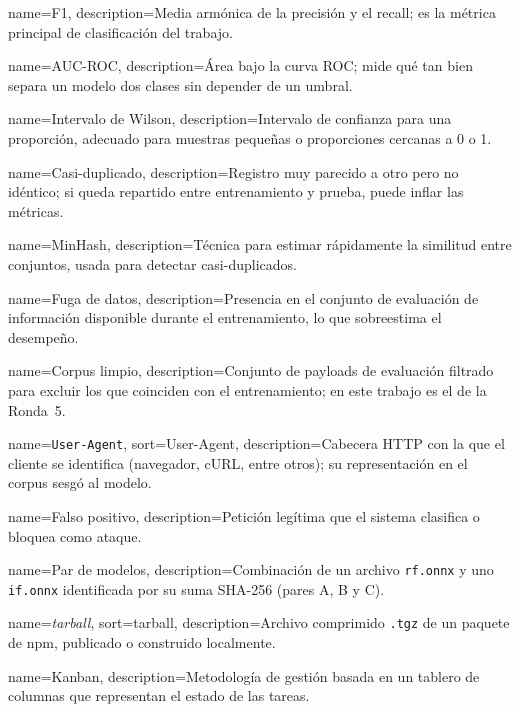{
    name={F1},
    description={Media armónica de la precisión y el recall; es la métrica principal de clasificación del trabajo.}
}

{
    name={AUC-ROC},
    description={Área bajo la curva ROC; mide qué tan bien separa un modelo dos clases sin depender de un umbral.}
}

{
    name={Intervalo de Wilson},
    description={Intervalo de confianza para una proporción, adecuado para muestras pequeñas o proporciones cercanas a 0 o 1.}
}

{
    name={Casi-duplicado},
    description={Registro muy parecido a otro pero no idéntico; si queda repartido entre entrenamiento y prueba, puede inflar las métricas.}
}

{
    name={MinHash},
    description={Técnica para estimar rápidamente la similitud entre conjuntos, usada para detectar casi-duplicados.}
}

{
    name={Fuga de datos},
    description={Presencia en el conjunto de evaluación de información disponible durante el entrenamiento, lo que sobreestima el desempeño.}
}

{
    name={Corpus limpio},
    description={Conjunto de payloads de evaluación filtrado para excluir los que coinciden con el entrenamiento; en este trabajo es el de la Ronda~5.}
}

{
    name={\texttt{User-Agent}},
    sort={User-Agent},
    description={Cabecera HTTP con la que el cliente se identifica (navegador, cURL, entre otros); su representación en el corpus sesgó al modelo.}
}

{
    name={Falso positivo},
    description={Petición legítima que el sistema clasifica o bloquea como ataque.}
}

{
    name={Par de modelos},
    description={Combinación de un archivo \texttt{rf.onnx} y uno \texttt{if.onnx} identificada por su suma SHA-256 (pares A, B y C).}
}

{
    name={\textit{tarball}},
    sort={tarball},
    description={Archivo comprimido \texttt{.tgz} de un paquete de npm, publicado o construido localmente.}
}

{
    name={Kanban},
    description={Metodología de gestión basada en un tablero de columnas que representan el estado de las tareas.}
}

